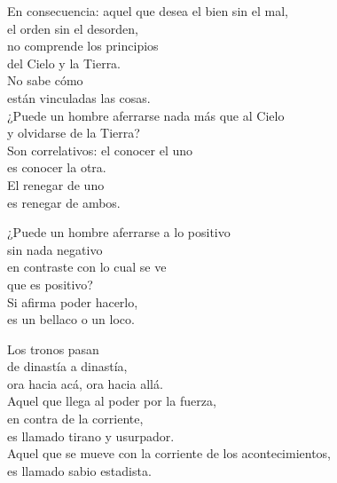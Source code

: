 \documentclass[book,b5paper,hidelinks,final]{memoir}
\begin{document}
	En consecuencia: aquel que desea el bien sin el mal,\\
	el orden sin el desorden,\\
	no comprende los principios\\
	del Cielo y la Tierra.\\
	No sabe cómo\\
	están vinculadas las cosas.\\
	¿Puede un hombre aferrarse nada más que al Cielo\\
	y olvidarse de la Tierra?\\
	Son correlativos: el conocer el uno\\
	es conocer la otra.\\
	El renegar de uno\\
	es renegar de ambos.
	
	¿Puede un hombre aferrarse a lo positivo\\
	sin nada negativo\\
	en contraste con lo cual se ve\\
	que es positivo?\\
	Si afirma poder hacerlo,\\
	es un bellaco o un loco.
	
	Los tronos pasan\\
	de dinastía a dinastía,\\
	ora hacia acá, ora hacia allá.\\
	Aquel que llega al poder por la fuerza,\\
	en contra de la corriente,\\
	es llamado tirano y usurpador.\\
	Aquel que se mueve con la corriente de los acontecimientos,\\
	es llamado sabio estadista.
	
\end{document}
